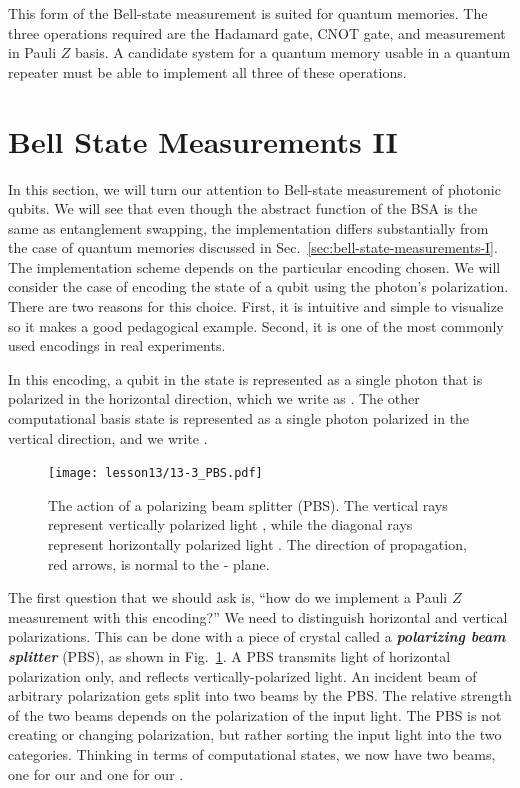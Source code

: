 This form of the Bell-state measurement is suited for quantum memories.
The three operations required are the Hadamard gate, CNOT gate, and measurement in Pauli $Z$ basis.
A candidate system for a quantum memory usable in a quantum repeater must be able to implement all three of these operations.



\section{Bell State Measurements II}
\label{sec:bell-state-measurements-II}

In this section, we will turn our attention to Bell-state measurement of photonic qubits.
We will see that even though the abstract function of the BSA is the same as entanglement swapping, the implementation differs substantially from the case of quantum memories discussed in Sec.~\ref{sec:bell-state-measurements-I}.
The implementation scheme depends on the particular encoding chosen.
We will consider the case of encoding the state of a qubit using the photon's polarization.
There are two reasons for this choice.
First, it is intuitive and simple to visualize so it makes a good pedagogical example.
Second, it is one of the most commonly used encodings in real experiments.

In this encoding, a qubit in the state  is represented as a single photon that is polarized in the horizontal direction, which we write as .
The other computational basis state  is represented as a single photon polarized in the vertical direction, and we write .

\begin{figure}[t]
    \centering
    \texttt{[image: lesson13/13-3\_PBS.pdf]}
    \caption[A polarizing beam splitter (PBS).]{The action of a polarizing beam splitter (PBS).  The vertical rays represent vertically polarized light , while the diagonal rays represent horizontally polarized light .  The direction of propagation, red arrows, is normal to the - plane.}
    \label{fig:13-PBS}
\end{figure}

The first question that we should ask is, ``how do we implement a Pauli $Z$ measurement with this encoding?''
We need to distinguish horizontal and vertical polarizations.
This can be done with a piece of crystal called a \emph{\textbf{polarizing beam splitter}} (PBS), as shown in Fig.~\ref{fig:13-PBS}.
A PBS transmits light of horizontal polarization only, and reflects vertically-polarized light.
An incident beam of arbitrary polarization gets split into two beams by the PBS.
The relative strength of the two beams depends on the polarization of the input light.
The PBS is not creating or changing polarization, but rather sorting the input light into the two categories.
Thinking in terms of computational states, we now have two beams, one for our  and one for our .

